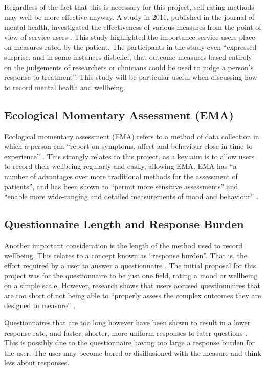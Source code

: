\documentclass[11pt,openright,a4paper]{report}
\begin{document}
Regardless of the fact that this is necessary for this project, self rating methods may well be more effective anyway. A study in 2011, published in the journal of mental health, investigated the effectiveness of various measures from the point of view of service users \parencite{crawford2011selecting}. This study highlighted the importance service users place on measures rated by the patient. The participants in the study even \enquote{expressed surprise, and in some instances disbelief, that outcome measures based entirely on the judgements of researchers or clinicians could be used to judge a person’s response to treatment}. This study will be particular useful when discussing how to record mental health and wellbeing.

\subsection{Ecological Momentary Assessment (EMA)} \label{sec:ema}
Ecological momentary assessment (EMA) refers to a method of data collection in which a person can \enquote{report on symptoms, affect and behaviour close in time to experience} \parencite{moskowitz2006ecological}. This strongly relates to this project, as a key aim is to allow users to record their wellbeing regularly and easily, allowing EMA. EMA has \enquote{a number of advantages over more traditional methods for the assessment of patients}, and has been shown to \enquote{permit more sensitive assessments} and \enquote{enable more wide-ranging and detailed measurements of mood and behaviour} \parencite{moskowitz2006ecological}.

\subsection{Questionnaire Length and Response Burden} \label{questionnairelength}
Another important consideration is the length of the method used to record wellbeing. This relates to a concept known as \enquote{response burden}. That is, the effort required by a user to answer a questionnaire \parencite{rolstad2011response}. The initial proposal for this project was for the questionnaire to be just one field, rating a mood or wellbeing on a simple scale. However, research shows that users accused questionnaires that are too short of not being able to \enquote{properly assess the complex
outcomes they are designed to measure} \parencite{crawford2011selecting}.

Questionnaires that are too long however have been shown to result in a lower response rate, and faster, shorter, more uniform responses to later questions \parencite{galesic2009effects}. This is possibly due to the questionnaire having too large a response burden for the user. The user may become bored or disillusioned with the measure and think less about responses.
\end{document}
